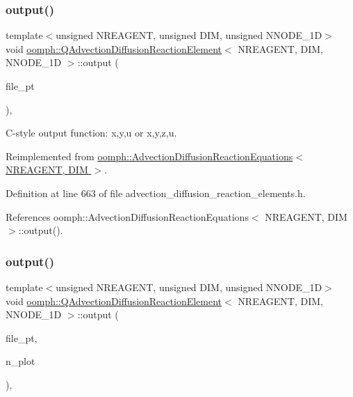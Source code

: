 \subsubsection{\texorpdfstring{output()}{output()}\hspace{0.1cm}{\footnotesize\ttfamily [3/4]}}
{\footnotesize\ttfamily template$<$unsigned N\+R\+E\+A\+G\+E\+NT, unsigned D\+IM, unsigned N\+N\+O\+D\+E\+\_\+1D$>$ \\
void \hyperlink{classoomph_1_1QAdvectionDiffusionReactionElement}{oomph\+::\+Q\+Advection\+Diffusion\+Reaction\+Element}$<$ N\+R\+E\+A\+G\+E\+NT, D\+IM, N\+N\+O\+D\+E\+\_\+1D $>$\+::output (\begin{DoxyParamCaption}\item[{F\+I\+LE $\ast$}]{file\+\_\+pt }\end{DoxyParamCaption})\hspace{0.3cm}{\ttfamily [inline]}, {\ttfamily [virtual]}}



C-\/style output function\+: x,y,u or x,y,z,u. 



Reimplemented from \hyperlink{classoomph_1_1AdvectionDiffusionReactionEquations_abb205e32ac157870312dd5d1180233b1}{oomph\+::\+Advection\+Diffusion\+Reaction\+Equations$<$ N\+R\+E\+A\+G\+E\+N\+T, D\+I\+M $>$}.



Definition at line 663 of file advection\+\_\+diffusion\+\_\+reaction\+\_\+elements.\+h.



References oomph\+::\+Advection\+Diffusion\+Reaction\+Equations$<$ N\+R\+E\+A\+G\+E\+N\+T, D\+I\+M $>$\+::output().

\mbox{\label{classoomph_1_1QAdvectionDiffusionReactionElement_abd8dbb087ca525304f3328d823311d6f}} 
\subsubsection{\texorpdfstring{output()}{output()}\hspace{0.1cm}{\footnotesize\ttfamily [4/4]}}
{\footnotesize\ttfamily template$<$unsigned N\+R\+E\+A\+G\+E\+NT, unsigned D\+IM, unsigned N\+N\+O\+D\+E\+\_\+1D$>$ \\
void \hyperlink{classoomph_1_1QAdvectionDiffusionReactionElement}{oomph\+::\+Q\+Advection\+Diffusion\+Reaction\+Element}$<$ N\+R\+E\+A\+G\+E\+NT, D\+IM, N\+N\+O\+D\+E\+\_\+1D $>$\+::output (\begin{DoxyParamCaption}\item[{F\+I\+LE $\ast$}]{file\+\_\+pt,  }\item[{const unsigned \&}]{n\+\_\+plot }\end{DoxyParamCaption})\hspace{0.3cm}{\ttfamily [inline]}, {\ttfamily [virtual]}}



